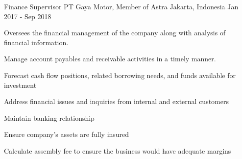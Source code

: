 \begin{cventries}
  \cventry
    {Finance Supervisor} %
    {PT Gaya Motor, Member of Astra} %
    {Jakarta, Indonesia} %
    {Jan 2017 - Sep 2018} %
    {
      \begin{cvitems} %
        \item {Oversees the financial management of the company along with analysis of financial information.}
        \item {Manage account payables and receivable activities in a timely manner.}
        \item {Forecast cash flow positions, related borrowing needs, and funds available for investment}
        \item {Address financial issues and inquiries from internal and external customers}
        \item {Maintain banking relationship}
        \item {Ensure company’s assets are fully insured}
        \item {Calculate assembly fee to ensure the business would have adequate margins}
      \end{cvitems}
    }



\end{cventries}
